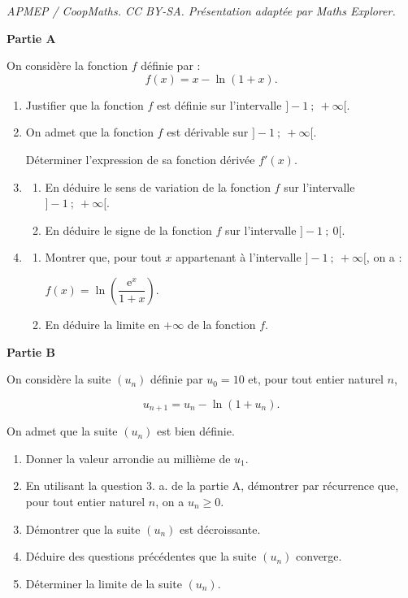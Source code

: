 \documentclass[10pt]{article}
\begin{document}
\noindent\textit{APMEP / CoopMaths. CC BY-SA. Présentation adaptée par Maths Explorer.}\par\medskip
\medskip

\textbf{Partie A}

\medskip

On considère la fonction $f$ définie par :
\[f(x) = x - \ln (1 + x).\]

\begin{enumerate}
\item Justifier que la fonction $f$ est définie sur l'intervalle $]-1~;~+ \infty[$.

\item On admet que la fonction $f$ est dérivable sur $]-1~;~+ \infty[$.

Déterminer l'expression de sa fonction dérivée $f'(x)$.
\item 
	\begin{enumerate}
		\item En déduire le sens de variation de la fonction $f$ sur l'intervalle $]-1~;~+ \infty[$.
		\item En déduire le signe de la fonction $f$ sur l'intervalle $]-1~;~0[$.
	\end{enumerate}
\item 
	\begin{enumerate}
		\item Montrer que, pour tout $x$ appartenant à l'intervalle $]-1~;~+ \infty[$, on a :

$f(x) = \ln \left(\dfrac{\text{e}^x}{1 + x}\right)$.
		\item En déduire la limite en $+ \infty$ de la fonction $f$.
	\end{enumerate}
\end{enumerate}

\medskip

\textbf{Partie B}

\medskip

On considère la suite $\left(u_n\right)$ définie par $u_0 = 10$ et, pour tout entier naturel $n$,

\[u_{n+1} = u_n- \ln \left(1 + u_n\right).\]

On admet que la suite $\left(u_n\right)$ est bien définie.

\medskip

\begin{enumerate}
\item Donner la valeur arrondie au millième de $u_1$.
\item En utilisant la question 3. a. de la partie A, démontrer par récurrence que, pour
tout entier naturel $n$, on a $u_n \geqslant 0$.
\item Démontrer que la suite $\left(u_n\right)$ est décroissante.
\item Déduire des questions précédentes que la suite $\left(u_n\right)$ converge.
\item Déterminer la limite de la suite $\left(u_n\right)$.

\end{enumerate}

\medskip
\end{document}
